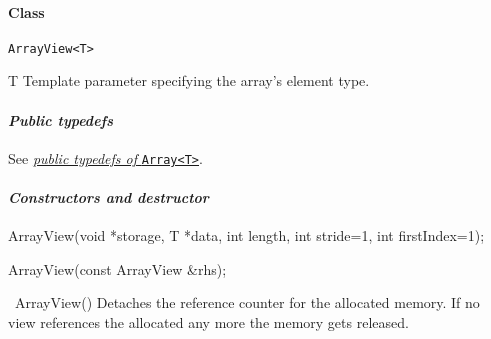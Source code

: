  
\newpage
  


  \paragraph{Class}{\tt \hypertarget{ArrayView}{ArrayView<T>}}


  \begin{CDescription}
  \item[T]
      Template parameter specifying the array's element type.
  \end{CDescription}

  \paragraph{{\it Public typedefs}}
  \begin{CDescription}
  \item[typedef ArrayView<T> View;           ,,%
        typedef ConstArrayView<T> ConstView;]
      See \hyperlink{Array:typedefs}{{\it public typedefs of} {\tt Array<T>}}.
  \end{CDescription}

  \paragraph{{\it Constructors and destructor}}
  \begin{CDescription}
  \item[ArrayView(void *storage, T *data,
                  int length, int stride=1, int firstIndex=1);]
          
  
  \item[ArrayView(const ArrayView &rhs);]

  \item[~ArrayView()]
      Detaches the reference counter for the allocated memory.  If no view
      references the allocated any more the memory gets released.
      
\end{CDescription}

